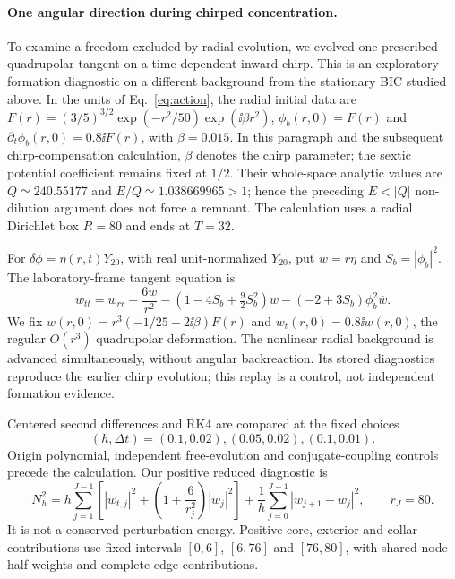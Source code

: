 \paragraph{One angular direction during chirped concentration.}
To examine a freedom excluded by radial evolution, we evolved one prescribed
quadrupolar tangent on a time-dependent inward chirp. This is an exploratory
formation diagnostic on a different background from the stationary BIC
studied above. In the units of Eq.~\eqref{eq:action}, the radial initial data are
$F(r)=(3/5)^{3/2}\exp(-r^2/50)\exp(\ii\beta r^2)$,
$\phi_b(r,0)=F(r)$ and $\partial_t\phi_b(r,0)=0.8\ii F(r)$,
with $\beta=0.015$. In this paragraph and the subsequent chirp-compensation
calculation, $\beta$ denotes the chirp parameter; the sextic potential
coefficient remains fixed at $1/2$. Their whole-space analytic values are
$Q\simeq240.55177$ and $E/Q\simeq1.038669965>1$; hence the preceding
$E<|Q|$ non-dilution argument does not force a remnant. The calculation
uses a radial Dirichlet box $R=80$ and ends at $T=32$.

For $\delta\phi=\eta(r,t)Y_{20}$, with real unit-normalized $Y_{20}$,
put $w=r\eta$ and $S_b=|\phi_b|^2$. The laboratory-frame tangent equation is
\begin{equation}
 w_{tt}=w_{rr}-\frac{6w}{r^2}
 -(1-4S_b+\tfrac92 S_b^2)w
 -(-2+3S_b)\phi_b^2\overline w .
 \label{eq:angular-chirp-tangent}
\end{equation}
We fix $w(r,0)=r^3(-1/25+2\ii\beta)F(r)$ and
$w_t(r,0)=0.8\ii w(r,0)$, the regular $O(r^3)$ quadrupolar deformation.
The nonlinear radial background is advanced simultaneously, without angular
backreaction. Its stored diagnostics reproduce the earlier chirp evolution;
this replay is a control, not independent formation evidence.

Centered second differences and RK4 are compared at the fixed choices
\[
(h,\Delta t)=(0.1,0.02),(0.05,0.02),(0.1,0.01).
\]
Origin polynomial, independent free-evolution and conjugate-coupling controls
precede the calculation. Our positive reduced diagnostic is
\begin{equation}
 N_h^2=h\sum_{j=1}^{J-1}
 \left[|w_{t,j}|^2+\left(1+\frac6{r_j^2}\right)|w_j|^2\right]
 +\frac1h\sum_{j=0}^{J-1}|w_{j+1}-w_j|^2,
 \qquad r_J=80 .
 \label{eq:angular-chirp-norm}
\end{equation}
It is not a conserved perturbation energy. Positive core, exterior and
collar contributions use fixed intervals $[0,6]$, $[6,76]$ and $[76,80]$,
with shared-node half weights and complete edge contributions.

